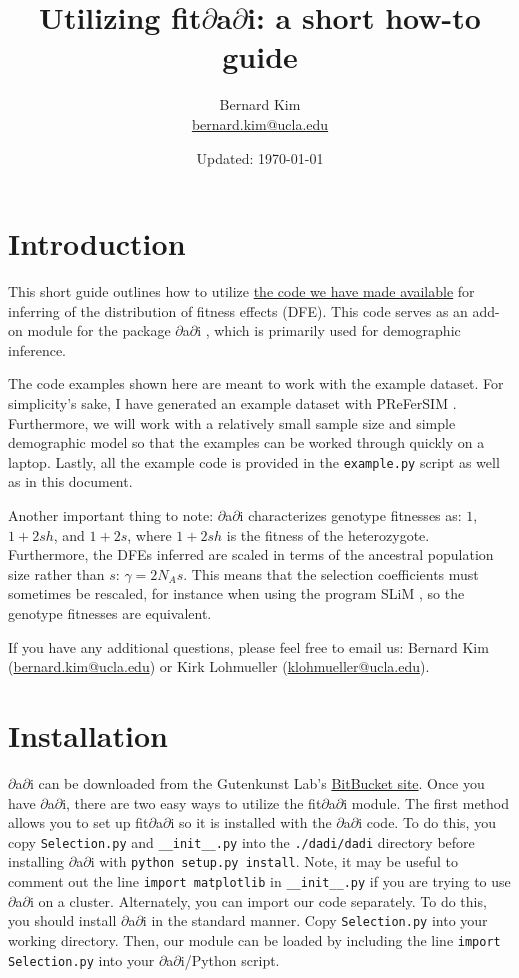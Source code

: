 \documentclass[11pt]{article}
\title{Utilizing fit$\partial$a$\partial$i: a short how-to guide}
\author{Bernard Kim\\ \href{mailto:bernard.kim@ucla.edu}{bernard.kim@ucla.edu}}
\date{Updated: \today}
\begin{document}
\maketitle

\section{Introduction}

This short guide outlines how to utilize \href{https://github.com/LohmuellerLab/fit$\partial$a$\partial$i}{the code we have made available} for inferring of the distribution of fitness effects (DFE). This code serves as an add-on module for the package $\partial$a$\partial$i \cite{gutenkunst2009}, which is primarily used for demographic inference.

The code examples shown here are meant to work with the example dataset. For simplicity's sake, I have generated an example dataset with PReFerSIM \cite{ortega2016}. Furthermore, we will work with a relatively small sample size and simple demographic model so that the examples can be worked through quickly on a laptop. Lastly, all the example code is provided in the \texttt{example.py} script as well as in this document.

Another important thing to note: $\partial$a$\partial$i characterizes genotype fitnesses as: $1$, $1+2sh$, and $1+2s$, where $1+2sh$ is the fitness of the heterozygote. Furthermore, the DFEs inferred are scaled in terms of the ancestral population size rather than $s$: $\gamma=2N_{A}s$. This means that the selection coefficients must sometimes be rescaled, for instance when using the program SLiM \cite{haller2016}, so the genotype fitnesses are equivalent.

If you have any additional questions, please feel free to email us: Bernard Kim \\(\href{mailto:bernard.kim@ucla.edu}{bernard.kim@ucla.edu}) or Kirk Lohmueller (\href{mailto:klohmueller@ucla.edu}{klohmueller@ucla.edu}).

\section{Installation}

$\partial$a$\partial$i can be downloaded from the Gutenkunst Lab's \href{https://bitbucket.org/gutenkunstlab/dadi/}{BitBucket site}. Once you have $\partial$a$\partial$i, there are two easy ways to utilize the fit$\partial$a$\partial$i module. The first method allows you to set up fit$\partial$a$\partial$i so it is installed with the $\partial$a$\partial$i code. To do this, you copy \texttt{Selection.py} and \texttt{\_\_init\_\_.py} into the \texttt{./dadi/dadi} directory before installing $\partial$a$\partial$i with \texttt{python setup.py install}. Note, it may be useful to comment out the line \texttt{import matplotlib} in \texttt{\_\_init\_\_.py} if you are trying to use $\partial$a$\partial$i on a cluster. Alternately, you can import our code separately. To do this, you should install $\partial$a$\partial$i in the standard manner. Copy \texttt{Selection.py} into your working directory. Then, our module can be loaded by including the line \texttt{import Selection.py} into your $\partial$a$\partial$i/Python script. 
\end{document}
